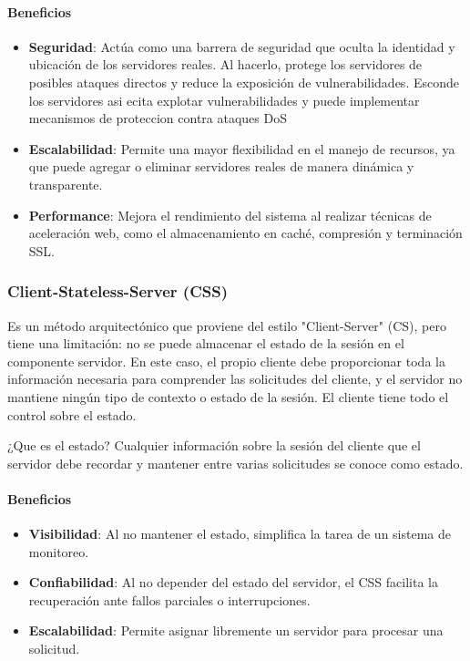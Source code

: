 \documentclass{article}
\begin{document}
		\paragraph{Beneficios}
		\begin{itemize}	
			\item {\textbf{Seguridad}}: Actúa como una barrera de seguridad que oculta la identidad y ubicación de los servidores reales. Al hacerlo, protege los servidores de posibles ataques directos y reduce la exposición de vulnerabilidades. Esconde los servidores asi ecita explotar vulnerabilidades y puede implementar mecanismos de proteccion contra ataques DoS
			
			\item {\textbf{Escalabilidad}}: Permite una mayor flexibilidad en el manejo de recursos, ya que puede agregar o eliminar servidores reales de manera dinámica y transparente.
			
			\item {\textbf{Performance}}: Mejora el rendimiento del sistema al realizar técnicas de aceleración web, como el almacenamiento en caché, compresión y terminación SSL.	
			
		\end{itemize}
		
		\subsubsection{Client-Stateless-Server (CSS)}
		Es un método arquitectónico que proviene del estilo "Client-Server" (CS), pero tiene una limitación: no se puede almacenar el estado de la sesión en el componente servidor. En este caso, el propio cliente debe proporcionar toda la información necesaria para comprender las solicitudes del cliente, y el servidor no mantiene ningún tipo de contexto o estado de la sesión. El cliente tiene todo el control sobre el estado.
		
		¿Que es el estado? Cualquier información sobre la sesión del cliente que el servidor debe recordar y mantener entre varias solicitudes se conoce como estado.
		
		
		\paragraph{Beneficios}
		\begin{itemize}	
			\item {\textbf{Visibilidad}}: Al no mantener el estado, simplifica la tarea de un sistema de monitoreo.
			
			\item {\textbf{Confiabilidad}}: Al no depender del estado del servidor, el CSS facilita la recuperación ante fallos parciales o interrupciones.
			
			\item {\textbf{Escalabilidad}}: Permite asignar libremente un servidor para procesar una solicitud.	
			
		\end{itemize}
		
\end{document}
